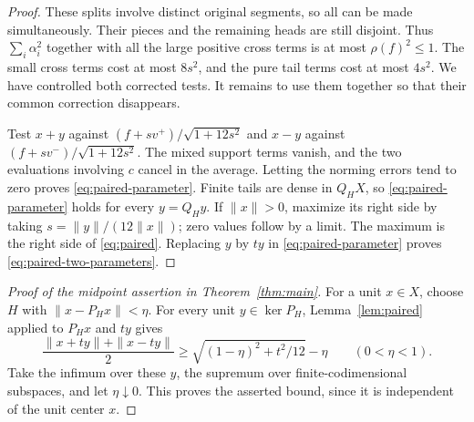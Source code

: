 \begin{proof}
These splits involve distinct original segments, so all can be made
simultaneously. Their pieces and the remaining heads are still
disjoint. Thus $\sum_i\alpha_i^2$ together with all the large
positive cross terms is at most $\rho(f)^2\le1$. The small cross terms
cost at most $8s^2$, and the pure tail terms cost at most $4s^2$.
We have controlled both corrected tests. It remains to use them
together so that their common correction disappears.

Test $x+y$ against $(f+sv^+)/\sqrt{1+12s^2}$ and $x-y$ against
$(f+sv^-)/\sqrt{1+12s^2}$. The mixed support terms vanish, and the
two evaluations involving $c$ cancel in the average. Letting the
norming errors tend to zero proves \eqref{eq:paired-parameter}. Finite tails are dense in
$Q_HX$, so \eqref{eq:paired-parameter} holds for every $y=Q_Hy$. If $\|x\|>0$, maximize
its right side by taking $s=\|y\|/(12\|x\|)$; zero values follow
by a limit. The maximum is the right side of \eqref{eq:paired}. Replacing $y$ by $ty$ in \eqref{eq:paired-parameter} proves
\eqref{eq:paired-two-parameters}.
\end{proof}

\begin{proof}[Proof of the midpoint assertion in Theorem~\ref{thm:main}]
For a unit $x\in X$, choose $H$ with $\|x-P_Hx\|<\eta$. For
every unit $y\in\ker P_H$, Lemma~\ref{lem:paired} applied to $P_Hx$ and $ty$ gives
\[
 \frac{\|x+ty\|+\|x-ty\|}{2}
 \ge\sqrt{(1-\eta)^2+t^2/12}-\eta
 \qquad(0<\eta<1).
\]
Take the infimum over these $y$, the supremum over finite-codimensional
subspaces, and let $\eta\downarrow0$. This proves
the asserted bound, since it is independent of the unit center $x$.
\end{proof}
